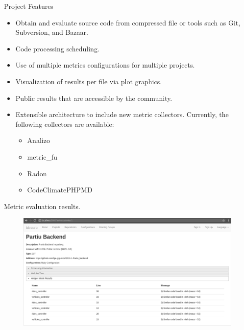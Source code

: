 \begin{block}{Project Features}
    \begin{itemize}
        \item Obtain and evaluate source code from compressed file or
            tools such as Git, Subversion, and Bazaar.
        \item Code processing scheduling.
        \item Use of multiple metrics configurations for multiple
            projects.
        \item Visualization of results per file via plot graphics.
        \item Public results that are accessible by the community.
        \item Extensible architecture to include new metric collectors.
            Currently, the following collectors are available:
            \begin{itemize}
                \item Analizo
                \item metric\_fu
                \item Radon
                \item CodeClimatePHPMD
            \end{itemize}
    \end{itemize}
\end{block}

\begin{block}{Metric evaluation results.}
    \begin{figure}
        \begin{center}
            \includegraphics[width=\textwidth]{figures/MetricProcessing.png}
                \label{fig:feature1}
        \end{center}
    \end{figure}
\end{block}

